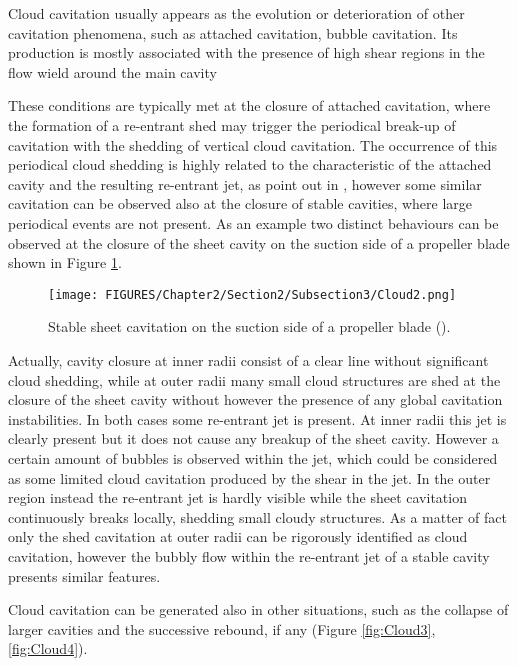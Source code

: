 Cloud cavitation usually appears as the evolution or deterioration of other cavitation phenomena, such as attached cavitation, bubble cavitation. Its production is mostly associated with the presence of high shear regions in the flow wield around the main cavity

These conditions are typically met at the closure of attached cavitation, where the formation of a re-entrant shed may trigger the periodical break-up of cavitation with the shedding of vertical cloud cavitation. The occurrence of this periodical cloud shedding is highly related to the characteristic of the attached cavity and the resulting re-entrant jet, as point out in \cite{franc2006fundamentals}, however some similar cavitation can be observed also at the closure of stable cavities, where large periodical events are not present. As an example two distinct behaviours can be observed at the closure of the sheet cavity on the suction side of a propeller blade shown in Figure \ref{fig:Cloud2}. 

\begin{figure}[h]
    \centering
    \texttt{[image: FIGURES/Chapter2/Section2/Subsection3/Cloud2.png]}  
    \caption{Stable sheet cavitation on the suction side of a propeller blade (\cite{Kuiper1998}).}  
    \label{fig:Cloud2}
\end{figure}

Actually, cavity closure at inner radii consist of a clear line without significant cloud shedding, while at outer radii many small cloud structures are shed at the closure of the sheet cavity without however the presence of any global cavitation instabilities. In both cases some re-entrant jet is present. At inner radii this jet is clearly present but it does not cause any breakup of the sheet cavity. However a certain amount of bubbles is observed within the jet, which could be considered as some limited cloud cavitation produced by the shear in the jet. In the outer region instead the re-entrant jet is hardly visible while the sheet cavitation continuously breaks locally, shedding small cloudy structures.
As a matter of fact only the shed cavitation at outer radii can be rigorously identified as cloud cavitation, however the bubbly flow within the re-entrant jet of a stable cavity presents similar features.

Cloud cavitation can be generated also in other situations, such as the collapse of larger cavities and the successive rebound, if any (Figure \ref{fig:Cloud3}, \ref{fig:Cloud4}).


